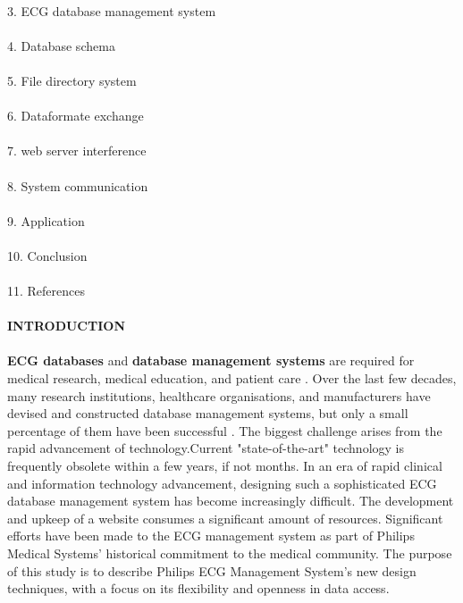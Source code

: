 \documentclass[12pt]{article}
\begin{document}
\paragraph{}3. ECG database management system
\paragraph{}4. Database schema
\paragraph{}5. File directory system
\paragraph{}6. Dataformate exchange
\paragraph{}7. web server interference

\paragraph{}8. System communication
\paragraph{}9. Application
\paragraph{}10. Conclusion
\paragraph{}11. References
\paragraph{\textbf{INTRODUCTION}}
\paragraph{} \textbf{ECG databases} and\textbf{ database management systems }are required for medical research, medical education, and patient care . Over the last few decades, many research institutions, healthcare organisations, and manufacturers have devised and constructed database management systems, but only a small percentage of them have been successful . The biggest challenge arises from the rapid advancement of technology.Current "state-of-the-art" technology is frequently obsolete within a few years, if not months. In an era of rapid clinical and information technology advancement, designing such a sophisticated ECG database management system has become increasingly difficult. The development and upkeep of a website consumes a significant amount of resources. Significant efforts have been made to the ECG management system as part of Philips Medical Systems' historical commitment to the medical community. The purpose of this study is to describe Philips ECG Management System's new design techniques, with a focus on its flexibility and openness in data access.
\end{document}
